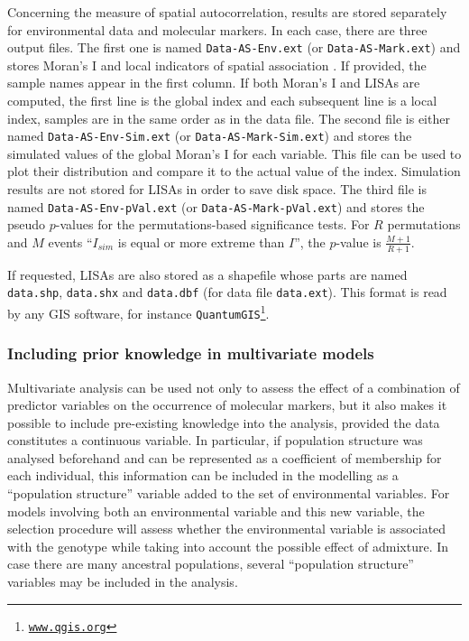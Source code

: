 \documentclass[a4paper,11pt]{article}
\newcommand{\prog}[1]{\texttt{#1}}
\begin{document}
Concerning the measure of spatial autocorrelation, results are stored separately for environmental data and molecular markers.
In each case, there are three output files.
The first one is named \prog{Data-AS-Env.ext} (or \prog{Data-AS-Mark.ext}) and stores Moran's I and local indicators of spatial association \parencite{anselin:1995}.
If provided, the sample names appear in the first column.
If both Moran's I and LISAs are computed, the first line is the global index and each subsequent line is a local index, samples are in the same order as in the data file.
The second file is either named \prog{Data-AS-Env-Sim.ext} (or \prog{Data-AS-Mark-Sim.ext}) and stores the simulated values of the global Moran's I for each variable.
This file can be used to plot their distribution and compare it to the actual value of the index.
Simulation results are not stored for LISAs in order to save disk space.
The third file is named \prog{Data-AS-Env-pVal.ext} (or \prog{Data-AS-Mark-pVal.ext}) and stores the pseudo $p$-values for the permutations-based significance tests.
For $R$ permutations and $M$ events \enquote{$I_{sim}$ is equal or more extreme than $I$}, the $p$-value is $\frac{M+1}{R+1}$.

If requested, LISAs are also stored as a shapefile whose parts are named \prog{data.shp}, \prog{data.shx} and \prog{data.dbf} (for data file \prog{data.ext}).
This format is read by any GIS software, for instance \prog{QuantumGIS\footnote{\url{www.qgis.org}}}.


\subsubsection{Including prior knowledge in multivariate models\label{sec:prior-knowledge}}
Multivariate analysis can be used not only to assess the effect of a combination of predictor variables on the occurrence of molecular markers, but it also makes it possible to include pre-existing knowledge into the analysis, provided the data constitutes a continuous variable. 
In particular, if population structure was analysed beforehand and can be represented as a coefficient of membership for each individual, this information can be included in the modelling as a  \enquote{population structure} variable added to the set of environmental variables.
For models involving both an environmental variable and this new variable, the selection procedure will assess whether the environmental variable is associated with the genotype while taking into account the possible effect of admixture.
In case there are many ancestral populations, several \enquote{population structure} variables may be included in the analysis.
\end{document}
